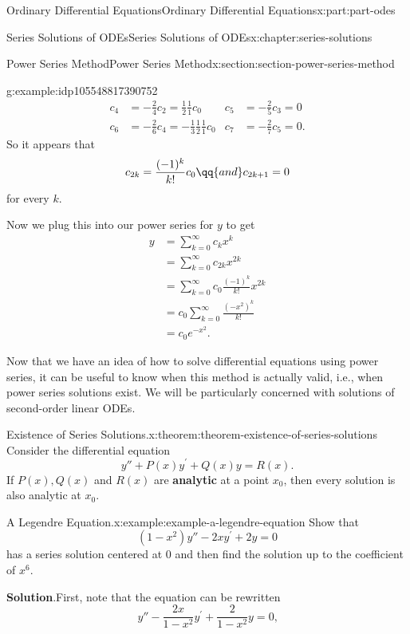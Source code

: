 \documentclass[twoside,10pt,]{book}
\newcommand{\blocktitlefont}{\relax}
\newcommand{\terminology}[1]{\textbf{#1}}
\numberwithin{equation}{part}
\newcommand{\amp}{&}
\begin{document}
\begin{partptx}{Ordinary Differential Equations}{}{Ordinary Differential Equations}{}{}{x:part:part-odes}
\begin{chapterptx}{Series Solutions of ODEs}{}{Series Solutions of ODEs}{}{}{x:chapter:series-solutions}
\begin{sectionptx}{Power Series Method}{}{Power Series Method}{}{}{x:section:section-power-series-method}
\begin{example}{}{g:example:idp105548817390752}
\begin{align*}
c_{4} \amp= -\frac{2}{4}c_{2} = \frac{1}{2}\frac{1}{1}c_{0} \amp c_{5} \amp= -\frac{2}{5}c_{3} = 0\\
c_{6} \amp= -\frac{2}{6}c_{4} = -\frac{1}{3}\frac{1}{2}\frac{1}{1}c_{0} \amp c_{7} \amp= -\frac{2}{7}c_{5} = 0\text{.}
\end{align*}
So it appears that%
\begin{equation*}
c_{2k} = \frac{(-1)^{k}}{k!}c_{0}\qq{and}c_{2k+1} = 0
\end{equation*}
for every \(k\).%
\par
Now we plug this into our power series for \(y\) to get%
\begin{align*}
y \amp= \sum_{k=0}^{\infty}c_{k}x^{k}\\
\amp= \sum_{k=0}^{\infty}c_{2k}x^{2k}\\
\amp= \sum_{k=0}^{\infty}c_{0}\frac{(-1)^{k}}{k!}x^{2k}\\
\amp= c_{0}\sum_{k=0}^{\infty}\frac{(-x^{2})^{k}}{k!}\\
\amp= c_{0}e^{-x^{2}}\text{.}
\end{align*}
%
\end{example}
Now that we have an idea of how to solve differential equations using power series, it can be useful to know when this method is actually valid, i.e., when power series solutions exist. We will be particularly concerned with solutions of second-order linear ODEs.%
\begin{theorem}{Existence of Series Solutions.}{}{x:theorem:theorem-existence-of-series-solutions}%
Consider the differential equation%
\begin{equation*}
y'' + P(x)y^\prime + Q(x)y = R(x)\text{.}
\end{equation*}
If \(P(x), Q(x)\) and \(R(x)\) are \terminology{analytic} at a point \(x_{0}\), then every solution is also analytic at \(x_{0}\).%
\end{theorem}
\begin{example}{A Legendre Equation.}{x:example:example-a-legendre-equation}%
Show that%
\begin{equation*}
(1 - x^{2})y'' - 2xy^\prime + 2y = 0
\end{equation*}
has a series solution centered at \(0\) and then find the solution up to the coefficient of \(x^{6}\).%
\par\smallskip%
\noindent\textbf{\blocktitlefont Solution}.\hypertarget{g:solution:idp105548817314720}{}\quad{}First, note that the equation can be rewritten%
\begin{equation*}
y'' - \frac{2x}{1 - x^{2}}y^\prime + \frac{2}{1 - x^{2}}y = 0\text{,}

\end{equation*}
\end{example}
\end{sectionptx}
\end{chapterptx}
\end{partptx}
\end{document}
